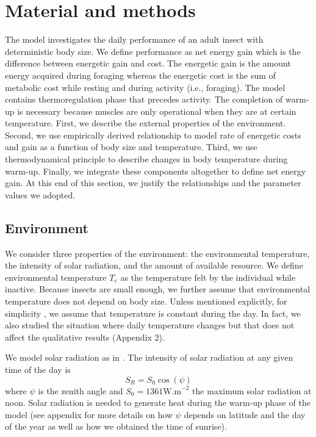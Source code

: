 \section*{Material and methods}
The model investigates the daily performance of an adult insect with deterministic body size.
We define performance as net energy gain which is the difference between energetic gain and cost.
The energetic gain is the amount energy acquired during foraging whereas  the energetic cost is the sum of metabolic cost while resting and during activity (i.e., foraging).
The model contains thermoregulation phase that precedes activity.
The completion of warm-up is necessary because muscles are only operational when they are at certain temperature. 
First, we describe the external properties of the environment.
Second, we use empirically derived relationship to model rate of energetic costs and gain as a function of body size and temperature.
Third, we use thermodynamical principle to describe changes in body temperature during warm-up.
Finally, we integrate these components altogether to define net energy gain. 
At this end of this section, we justify the relationships and the parameter values we adopted.

\subsection*{Environment}
We consider three properties of the environment: the environmental temperature, the intensity of solar radiation, and the amount of available resource.
We define environmental temperature $T_e$ as the temperature felt by the individual while inactive.
Because insects are small enough, we further assume that environmental temperature does not depend on body size.
Unless mentioned explicitly, for simplicity , we assume that temperature is constant during the day. 
In fact, we also studied the situation where daily temperature changes but that does not affect the qualitative results (Appendix 2). %

We model solar radiation as in \citet{Campbell2012}.
The intensity of solar radiation at any given time of the day is \[S_R = S_0 \cos(\psi) \]
where $\psi$ is the zenith angle and $S_0 = 1361 \mbox{W.m}^{-2}$ the maximum solar radiation at noon.
Solar radiation is needed to generate heat during the warm-up phase of the model (see appendix for more details on how $\psi$ depends on latitude and the day of the year as well as how we obtained the time of sunrise).

